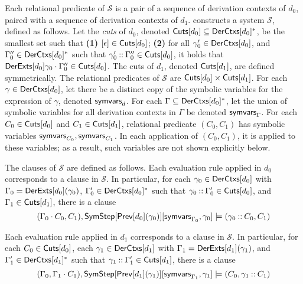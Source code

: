 Each relational predicate of $\mathcal{S}$ is a pair of a sequence of
derivation contexts of $d_0$, paired with a sequence of derivation
contexts of $d_1$.
\verifyders constructs a system $\mathcal{S}$, defined as follows.
%
Let the \emph{cuts} of $d_0$, denoted $\mathsf{Cuts}[ d_0 ] \subseteq \mathsf{DerCtxs}[ 
  d_0  ]^{*}$, be the smallest set such that %
\textbf{(1)} $[ \epsilon ] \in \mathsf{Cuts}[ d_0 ]$; %
\textbf{(2)} for all $\gamma_0' \in \mathsf{DerCtxs}[  d_0  ]$, and %
$\Gamma_0'' \in \mathsf{DerCtxs}[  d_0  ]^{*}$ such that $\gamma_0' \mathbin{::}
\Gamma_0'' \in \mathsf{Cuts}[  d_0  ]$, %
it holds that $\mathsf{DerExts}[  d_0  ]{ \gamma_0 } \cdot \Gamma_0'' \in
\mathsf{Cuts}[ d_0 ]$.
%
The cuts of $d_1$, denoted $\mathsf{Cuts}[ d_1 ]$, are defined symmetrically.
The relational predicates of $\mathcal{S}$ are $\mathsf{Cuts}[ d_0 ] \times
\mathsf{Cuts}[ d_1 ]$.
%
For each $\gamma \in \mathsf{DerCtxs}[ d_0 ]$, let there be a distinct copy of
the symbolic variables for the expression of $\gamma$, denoted
$\mathsf{symvars}_{d}$.
%
For each $\Gamma \subseteq \mathsf{DerCtxs}[ d_0 ]^{*}$, let the union of
symbolic variables for all derivation contexts in $\Gamma$ be denoted
$\mathsf{symvars}_{ \Gamma }$.
%
For each $C_0 \in \mathsf{Cuts}[  d_0  ]$ and $C_1 \in \mathsf{Cuts}[  d_1  ]$, relational
predicate $(C_0, C_1)$ has symbolic variables $\mathsf{symvars}_{C_0},
\mathsf{symvars}_{C_1}$.
%
In each application of $(C_0, C_1)$, it is applied to these variables;
%
as a result, such variables are not shown explicitly below.

The clauses of $\mathcal{S}$ are defined as follows.
%
Each evaluation rule applied in $d_0$ corresponds to a clause in
$\mathcal{S}$.
% 
In particular, for each $\gamma_0 \in \mathsf{DerCtxs}[  d_0  ]$ with $\Gamma_0
= \mathsf{DerExts}[  d_0  ]( \gamma_0 )$, %
$\Gamma_0' \in \mathsf{DerCtxs}[  d_0  ]^{*}$ such that $\gamma_0 \mathbin{::}
\Gamma_0' \in \mathsf{Cuts}[  d_0  ]$, and %
$\Gamma_1 \in \mathsf{Cuts}[  d_1  ]$, there is a clause %
\[ (\Gamma_0 \concat C_0, C_1), %
\symstep{ \prevrule{ d_0 }( \gamma_0 ) }[ %
\symvars{ \Gamma_0 }, \gamma_0 ] \entails %
(\gamma_0 \cons C_0, C_1) \]

Each evaluation rule applied in $d_1$ corresponds to a clause in
$\mathcal{S}$.
%
In particular, for each $C_0 \in \mathsf{Cuts}[  d_0  ]$, %
each $\gamma_1 \in \mathsf{DerCtxs}[  d_1  ]$ with $\Gamma_1 = \mathsf{DerExts}[ d_1 ](
\gamma_1 )$, and %
$\Gamma_1' \in \mathsf{DerCtxs}[  d_1  ]^{*}$ such that $\gamma_1 \mathbin{::}
\Gamma_1' \in \mathsf{Cuts}[  d_1  ]$, there is a clause
\[ ( \Gamma_0, \Gamma_1 \concat C_1), %
   \symstep{ \prevrule{ d_1 }( \gamma_1 ) }[ %
   \symvars{ \Gamma_1 }, \gamma_1 ] \entails %
   (C_0, \gamma_1 \cons C_1) \]

